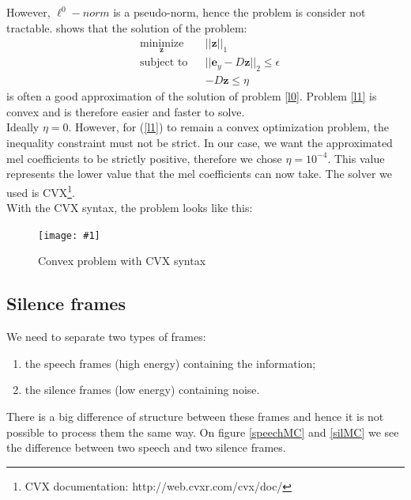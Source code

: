 \documentclass[a4paper]{report}
\newcommand{\img}[3]{\begin{figure}[!h] \centering \texttt{[image: \#1]}\captionsetup{justification=centering} \caption{#3} \label{#1} \end{figure}}
\newcommand{\ey}{\textbf{e}_y}
\newcommand{\zhat}{ \hat{\textbf{z}} }
\begin{document}

However, $\ell^0-norm$ is a pseudo-norm, hence the problem is consider not tractable. \cite{equivalencel1l0} shows that the solution of the problem:
\begin{equation}
  \begin{aligned}
    & \underset{\mathbf{z}}{\text{minimize}}
    & & ||\mathbf{z}||_1 \\
    & \text{subject to}
    & & ||\ey -D\mathbf{z}||_2 \leq \epsilon\\
    &&& -D\mathbf{z} \leq \eta
  \end{aligned}
\label{l1}
\end{equation}
 is often a good approximation of the solution of problem \ref{l0}. Problem \ref{l1} is convex and is therefore easier and faster to solve.\\
Ideally $\eta = 0$. However, for (\ref{l1}) to remain a convex optimization problem, the inequality constraint must not be strict. In our case, we want the approximated mel coefficients to be strictly positive, therefore we chose $\eta = 10^{-4}$. This value represents the lower value that the mel coefficients can now take.
The solver we used is CVX\footnote{CVX documentation: http://web.cvxr.com/cvx/doc/}.\\

With the CVX syntax, the problem looks like this:
\img{convex_problem}{.7}{Convex problem with CVX syntax}


\subsection{Silence frames}
We need to separate two types of frames:\begin{enumerate}
\item the speech frames (high energy) containing the information;
\item the silence frames (low energy) containing  noise. \end{enumerate}

There is a big difference of structure between these frames and hence it is not possible to process them the same way.
On figure \ref{speechMC} and \ref{silMC} we see the difference  between two speech and two silence frames.
\end{document}
